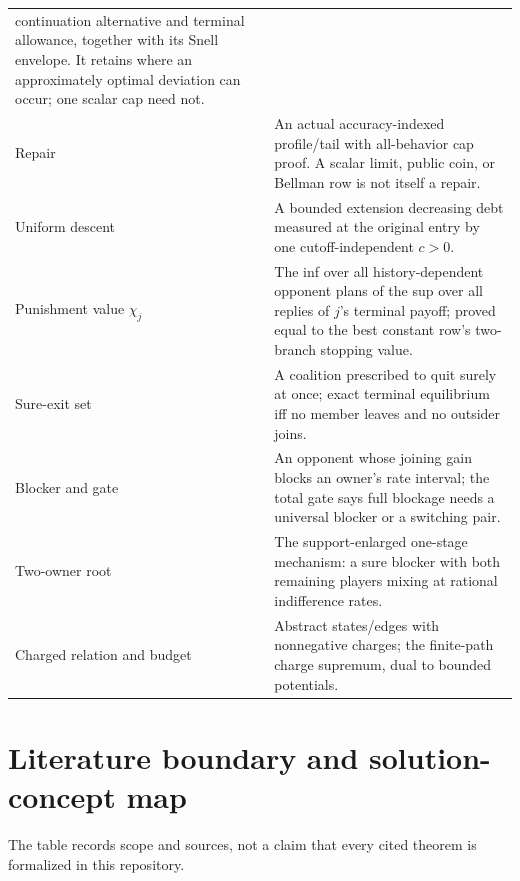 \documentclass[11pt]{article}
\begin{document}
\begin{longtable}{@{}p{}p{}@{}}
continuation alternative and terminal allowance, together with its Snell
envelope.  It retains where an approximately optimal deviation can occur;
one scalar cap need not.\\
Repair & An actual accuracy-indexed profile/tail with all-behavior cap proof.
A scalar limit, public coin, or Bellman row is not itself a repair.\\
Uniform descent & A bounded extension decreasing debt measured at the
original entry by one cutoff-independent \(c>0\).\\
Punishment value \(\chi_j\) & The inf over all history-dependent opponent
plans of the sup over all replies of \(j\)'s terminal payoff; proved equal
to the best constant row's two-branch stopping value.\\
Sure-exit set & A coalition prescribed to quit surely at once; exact
terminal equilibrium iff no member leaves and no outsider joins.\\
Blocker and gate & An opponent whose joining gain blocks an owner's rate
interval; the total gate says full blockage needs a universal blocker or a
switching pair.\\
Two-owner root & The support-enlarged one-stage mechanism: a sure blocker
with both remaining players mixing at rational indifference rates.\\
Charged relation and budget & Abstract states/edges with nonnegative
charges; the finite-path charge supremum, dual to bounded potentials.\\
\bottomrule
\end{longtable}

\section{Literature boundary and solution-concept map}

The table records scope and sources, not a claim that every cited theorem is
formalized in this repository.
\end{document}
